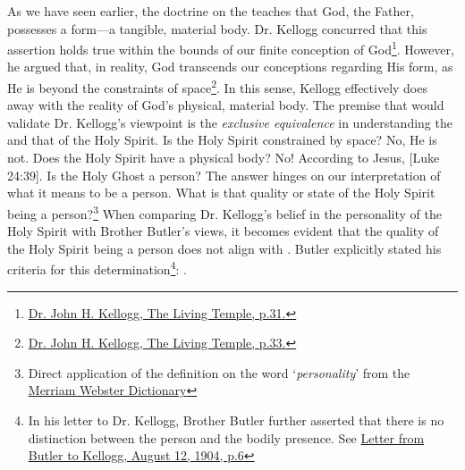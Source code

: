 As we have seen earlier, the doctrine on the  teaches that God, the Father, possesses a form—a tangible, material body. Dr. Kellogg concurred that this assertion holds true within the bounds of our finite conception of God\footnote{\href{https://archive.org/details/J.H.Kellogg.TheLivingTemple1903/page/n33/}{Dr. John H. Kellogg, The Living Temple, p.31.}}. However, he argued that, in reality, God transcends our conceptions regarding His form, as He is beyond the constraints of space\footnote{\href{https://archive.org/details/J.H.Kellogg.TheLivingTemple1903/page/n33/}{Dr. John H. Kellogg, The Living Temple, p.33.}}. In this sense, Kellogg effectively does away with the reality of God’s physical, material body. The premise that would validate Dr. Kellogg’s viewpoint is the \textit{exclusive equivalence} in understanding the  and that of the Holy Spirit. Is the Holy Spirit constrained by space? No, He is not. Does the Holy Spirit have a physical body? No! According to Jesus, [Luke 24:39]. Is the Holy Ghost a person? The answer hinges on our interpretation of what it means to be a person. What is that quality or state of the Holy Spirit being a person?\footnote{Direct application of the definition on the word ‘\textit{personality}’ from the \href{https://www.merriam-webster.com/dictionary/personality}{Merriam Webster Dictionary}} When comparing Dr. Kellogg's belief in the personality of the Holy Spirit with Brother Butler's views, it becomes evident that the quality of the Holy Spirit being a person does not align with . Butler explicitly stated his criteria for this determination\footnote{In his letter to Dr. Kellogg, Brother Butler further asserted that there is no distinction between the person and the bodily presence. See \href{https://c7da.us/egwdl/Butler\%20to\%20Kellogg\%20Aug121904.pdf}{Letter from Butler to Kellogg, August 12, 1904, p.6}}: .


